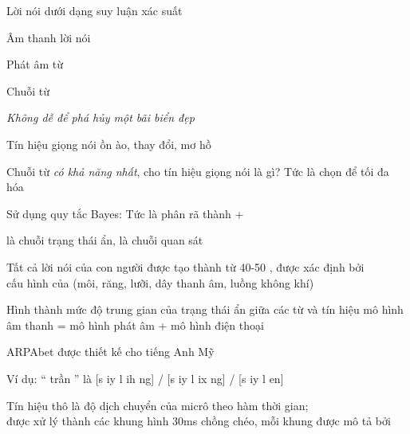 \documentclass{article}
\begin{document}
\begin{huge}

\sf


\blob Lời nói dưới dạng suy luận xác suất

\blob Âm thanh lời nói

\blob Phát âm từ

\blob Chuỗi từ



\emph{Không dễ để phá hủy một bãi biển đẹp}

Tín hiệu giọng nói ồn ào, thay đổi, mơ hồ

Chuỗi từ \emph{có khả năng nhất}, cho tín hiệu giọng nói là gì?\al
Tức là chọn  để tối đa hóa 

Sử dụng quy tắc Bayes:
\mat{\[
P(Words|signal) = \alpha P(signal|Words) P(Words)
\]}%
Tức là phân rã thành  + 

 là chuỗi trạng thái ẩn,  là chuỗi quan sát


Tất cả lời nói của con người được tạo thành từ 40-50 , được xác định bởi \\
cấu hình của  (môi, răng, lưỡi, dây thanh âm, luồng không khí)

Hình thành mức độ trung gian của trạng thái ẩn giữa các từ và tín hiệu\nl
  \mat{$\Rightarrow$} mô hình âm thanh = mô hình phát âm + mô hình điện thoại

ARPAbet được thiết kế cho tiếng Anh Mỹ



Ví dụ: `` trần '' là [s iy l ih ng] / [s iy l ix ng] / [s iy l en]



Tín hiệu thô là độ dịch chuyển của micrô theo hàm thời gian;\\
được xử lý thành các khung hình 30ms  chồng chéo, mỗi khung được mô tả bởi 


\end{huge}
\end{document}
